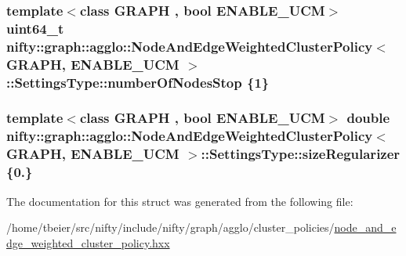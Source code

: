 \subsubsection[{number\+Of\+Nodes\+Stop}]{\setlength{\rightskip}{0pt plus 5cm}template$<$class G\+R\+A\+P\+H , bool E\+N\+A\+B\+L\+E\+\_\+\+U\+C\+M$>$ uint64\+\_\+t {\bf nifty\+::graph\+::agglo\+::\+Node\+And\+Edge\+Weighted\+Cluster\+Policy}$<$ G\+R\+A\+P\+H, E\+N\+A\+B\+L\+E\+\_\+\+U\+C\+M $>$\+::Settings\+Type\+::number\+Of\+Nodes\+Stop \{1\}}\label{structnifty_1_1graph_1_1agglo_1_1NodeAndEdgeWeightedClusterPolicy_1_1SettingsType_aee8176a814f59a05d6919b419c1bd16d}
\hypertarget{structnifty_1_1graph_1_1agglo_1_1NodeAndEdgeWeightedClusterPolicy_1_1SettingsType_aca88c9142fbe9a8789c52042136f7726}{}
\subsubsection[{size\+Regularizer}]{\setlength{\rightskip}{0pt plus 5cm}template$<$class G\+R\+A\+P\+H , bool E\+N\+A\+B\+L\+E\+\_\+\+U\+C\+M$>$ double {\bf nifty\+::graph\+::agglo\+::\+Node\+And\+Edge\+Weighted\+Cluster\+Policy}$<$ G\+R\+A\+P\+H, E\+N\+A\+B\+L\+E\+\_\+\+U\+C\+M $>$\+::Settings\+Type\+::size\+Regularizer \{0.\}}\label{structnifty_1_1graph_1_1agglo_1_1NodeAndEdgeWeightedClusterPolicy_1_1SettingsType_aca88c9142fbe9a8789c52042136f7726}


The documentation for this struct was generated from the following file\+:\begin{DoxyCompactItemize}
\item 
/home/tbeier/src/nifty/include/nifty/graph/agglo/cluster\+\_\+policies/\hyperlink{node__and__edge__weighted__cluster__policy_8hxx}{node\+\_\+and\+\_\+edge\+\_\+weighted\+\_\+cluster\+\_\+policy.\+hxx}\end{DoxyCompactItemize}
